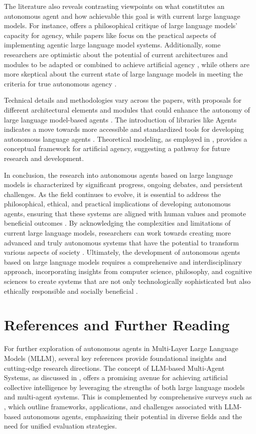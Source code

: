 \documentclass[conference]{IEEEtran}
\begin{document}
The literature also reveals contrasting viewpoints on what constitutes an autonomous agent and how achievable this goal is with current large language models. For instance, \cite{2407.10735} offers a philosophical critique of large language models' capacity for agency, while papers like \cite{2412.04093} focus on the practical aspects of implementing agentic large language model systems. Additionally, some researchers are optimistic about the potential of current architectures and modules to be adapted or combined to achieve artificial agency \cite{2403.11381}, while others are more skeptical about the current state of large language models in meeting the criteria for true autonomous agency \cite{2407.10735}.

Technical details and methodologies vary across the papers, with proposals for different architectural elements and modules that could enhance the autonomy of large language model-based agents \cite{2412.04093}. The introduction of libraries like Agents indicates a move towards more accessible and standardized tools for developing autonomous language agents \cite{2309.07870}. Theoretical modeling, as employed in \cite{2407.16190}, provides a conceptual framework for artificial agency, suggesting a pathway for future research and development.

In conclusion, the research into autonomous agents based on large language models is characterized by significant progress, ongoing debates, and persistent challenges. As the field continues to evolve, it is essential to address the philosophical, ethical, and practical implications of developing autonomous agents, ensuring that these systems are aligned with human values and promote beneficial outcomes \cite{2407.16190}. By acknowledging the complexities and limitations of current large language models, researchers can work towards creating more advanced and truly autonomous systems that have the potential to transform various aspects of society \cite{2308.11432}. Ultimately, the development of autonomous agents based on large language models requires a comprehensive and interdisciplinary approach, incorporating insights from computer science, philosophy, and cognitive sciences to create systems that are not only technologically sophisticated but also ethically responsible and socially beneficial \cite{2407.16190}.

\section{References and Further Reading}
For further exploration of autonomous agents in Multi-Layer Large Language Models (MLLM), several key references provide foundational insights and cutting-edge research directions. The concept of LLM-based Multi-Agent Systems, as discussed in \cite{2411.14033}, offers a promising avenue for achieving artificial collective intelligence by leveraging the strengths of both large language models and multi-agent systems. This is complemented by comprehensive surveys such as \cite{2308.11432}, which outline frameworks, applications, and challenges associated with LLM-based autonomous agents, emphasizing their potential in diverse fields and the need for unified evaluation strategies.
\end{document}
